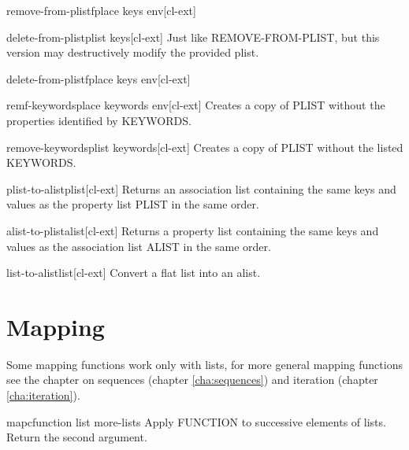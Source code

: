 \documentclass[10pt,english]{book}
\begin{document}
\begin{macro}{remove-from-plistf}{place \rest keys \env env}[cl-ext]
  
\end{macro}

\begin{function}{delete-from-plist}{plist \rest keys}[cl-ext]
  Just like REMOVE-FROM-PLIST, but this version may destructively modify the
provided plist.
\end{function}

\begin{macro}{delete-from-plistf}{place \rest keys \env env}[cl-ext]
  
\end{macro}

\begin{macro}{remf-keywords}{place \rest keywords \env env}[cl-ext]
  Creates a copy of PLIST without the properties identified by KEYWORDS.
\end{macro}

\begin{function}{remove-keywords}{plist \rest keywords}[cl-ext]
  Creates a copy of PLIST without the listed KEYWORDS.
\end{function}

\begin{function}{plist-to-alist}{plist}[cl-ext]
  Returns an association list containing the same keys and values as the
property list PLIST in the same order.
\end{function}

\begin{function}{alist-to-plist}{alist}[cl-ext]
  Returns a property list containing the same keys and values as the
association list ALIST in the same order.
\end{function}

\begin{function}{list-to-alist}{list}[cl-ext]
  Convert a flat list into an alist.
\end{function}

\section{Mapping}
\label{sec:mapping}

Some mapping functions work only with lists, for more general mapping
functions see the chapter on sequences (chapter \ref{cha:sequences}) and
iteration (chapter \ref{cha:iteration}).

\begin{function}{mapc}{function list \rest more-lists}
  Apply FUNCTION to successive elements of lists. Return the second argument.
\end{function}
\end{document}
